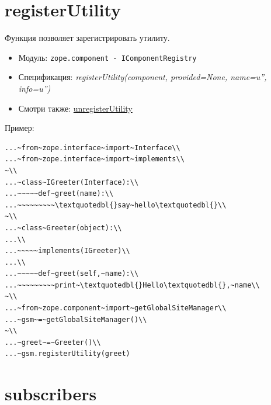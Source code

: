 \documentclass[a4paper,openany,twoside,draft]{book}
\providecommand*{\DUroletitlereference}[1]{\textsl{#1}}
\begin{document}
\section*{registerUtility%
  \label{registerutility}%
}

Функция позволяет зарегистрировать утилиту.

\begin{itemize}

\item Модуль: \texttt{zope.component - IComponentRegistry}

\item Спецификация: \DUroletitlereference{registerUtility(component, provided=None, name=u'',
info=u'')}

\item Смотри также: \hyperref[unregisterutility]{unregisterUtility}

\end{itemize}

Пример:

\begin{verbatim}
...~from~zope.interface~import~Interface\\
...~from~zope.interface~import~implements\\
~\\
...~class~IGreeter(Interface):\\
...~~~~~def~greet(name):\\
...~~~~~~~~~\textquotedbl{}say~hello\textquotedbl{}\\
~\\
...~class~Greeter(object):\\
...\\
...~~~~~implements(IGreeter)\\
...\\
...~~~~~def~greet(self,~name):\\
...~~~~~~~~~print~\textquotedbl{}Hello\textquotedbl{},~name\\
~\\
...~from~zope.component~import~getGlobalSiteManager\\
...~gsm~=~getGlobalSiteManager()\\
~\\
...~greet~=~Greeter()\\
...~gsm.registerUtility(greet)
\end{verbatim}


\section*{subscribers%
  \label{subscribers}%
}
\end{document}
